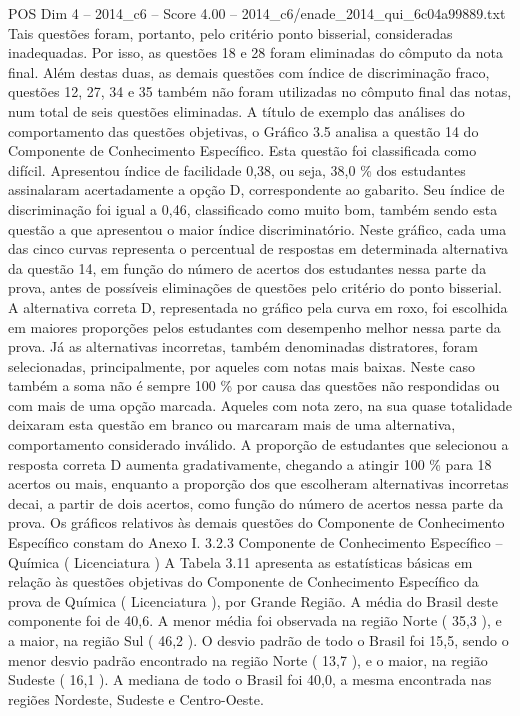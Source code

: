 \begin{textsample}{POS Dim 4 – 2014\_c6 – Score 4.00 – 2014\_c6/enade\_2014\_qui\_6c04a99889.txt}
Tais questões foram, portanto, pelo critério ponto bisserial, consideradas inadequadas.
Por isso, as questões 18 e 28 foram eliminadas do cômputo da nota final.
Além destas duas, as demais questões com índice de discriminação fraco, questões 12, 27, 34 e 35 também não foram utilizadas no cômputo final das notas, num total de seis questões eliminadas.
A título de exemplo das análises do comportamento das questões objetivas, o Gráfico 3.5 analisa a questão 14 do Componente de Conhecimento Específico.
Esta questão foi classificada como difícil.
Apresentou índice de facilidade 0,38, ou seja, 38,0 \% dos estudantes assinalaram acertadamente a opção D, correspondente ao gabarito.
Seu índice de discriminação foi igual a 0,46, classificado como muito bom, também sendo esta questão a que apresentou o maior índice discriminatório.
Neste gráfico, cada uma das cinco curvas representa o percentual de respostas em determinada alternativa da questão 14, em função do número de acertos dos estudantes nessa parte da prova, antes de possíveis eliminações de questões pelo critério do ponto bisserial.
A alternativa correta D, representada no gráfico pela curva em roxo, foi escolhida em maiores proporções pelos estudantes com desempenho melhor nessa parte da prova.
Já as alternativas incorretas, também denominadas distratores, foram selecionadas, principalmente, por aqueles com notas mais baixas.
Neste caso também a soma não é sempre 100 \% por causa das questões não respondidas ou com mais de uma opção marcada.
Aqueles com nota zero, na sua quase totalidade deixaram esta questão em branco ou marcaram mais de uma alternativa, comportamento considerado inválido.
A proporção de estudantes que selecionou a resposta correta D aumenta gradativamente, chegando a atingir 100 \% para 18 acertos ou mais, enquanto a proporção dos que escolheram alternativas incorretas decai, a partir de dois acertos, como função do número de acertos nessa parte da prova.
Os gráficos relativos às demais questões do Componente de Conhecimento Específico constam do Anexo I. 3.2.3 Componente de Conhecimento Específico – Química ( Licenciatura ) A Tabela 3.11 apresenta as estatísticas básicas em relação às questões objetivas do Componente de Conhecimento Específico da prova de Química ( Licenciatura ), por Grande Região.
A média do Brasil deste componente foi de 40,6.
A menor média foi observada na região Norte ( 35,3 ), e a maior, na região Sul ( 46,2 ).
O desvio padrão de todo o Brasil foi 15,5, sendo o menor desvio padrão encontrado na região Norte ( 13,7 ), e o maior, na região Sudeste ( 16,1 ).
A mediana de todo o Brasil foi 40,0, a mesma encontrada nas regiões Nordeste, Sudeste e Centro-Oeste.

\end{textsample}
